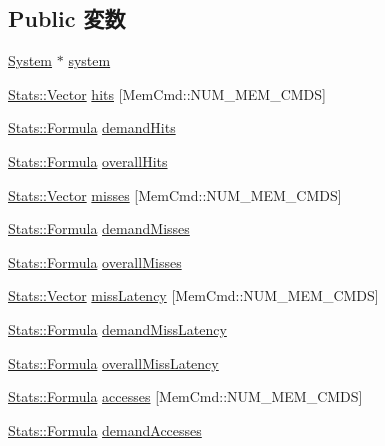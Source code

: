 \subsection*{Public 変数}
\begin{DoxyCompactItemize}
\item 
\hyperlink{classSystem}{System} $\ast$ \hyperlink{classBaseCache_af27ccd765f13a4b7bd119dc7579e2746}{system}
\item 
\hyperlink{classStats_1_1Vector}{Stats::Vector} \hyperlink{group__CacheStatistics_gad6a8ff96d397437943d0a35012008e84}{hits} \mbox{[}MemCmd::NUM\_\-MEM\_\-CMDS\mbox{]}
\item 
\hyperlink{classStats_1_1Formula}{Stats::Formula} \hyperlink{group__CacheStatistics_gafc2d55cfff6a5b55a9c19bf5c7b13729}{demandHits}
\item 
\hyperlink{classStats_1_1Formula}{Stats::Formula} \hyperlink{group__CacheStatistics_gaa4d78014f29a4bc534e1d71a1ada3bb8}{overallHits}
\item 
\hyperlink{classStats_1_1Vector}{Stats::Vector} \hyperlink{group__CacheStatistics_gaef820137ee3e0d7ce5895019f76e1ad7}{misses} \mbox{[}MemCmd::NUM\_\-MEM\_\-CMDS\mbox{]}
\item 
\hyperlink{classStats_1_1Formula}{Stats::Formula} \hyperlink{group__CacheStatistics_gab0c200c0250a66f1e1d8a257d3f9f313}{demandMisses}
\item 
\hyperlink{classStats_1_1Formula}{Stats::Formula} \hyperlink{group__CacheStatistics_ga15889ae23e7332b01de9bc31e05a21e5}{overallMisses}
\item 
\hyperlink{classStats_1_1Vector}{Stats::Vector} \hyperlink{group__CacheStatistics_gaf96751c776ee651f3284e22686b8978a}{missLatency} \mbox{[}MemCmd::NUM\_\-MEM\_\-CMDS\mbox{]}
\item 
\hyperlink{classStats_1_1Formula}{Stats::Formula} \hyperlink{group__CacheStatistics_gaef1ab5073e901bd4df644ff0780fc668}{demandMissLatency}
\item 
\hyperlink{classStats_1_1Formula}{Stats::Formula} \hyperlink{group__CacheStatistics_ga7d70913fe3dbd532369b977f9a28446c}{overallMissLatency}
\item 
\hyperlink{classStats_1_1Formula}{Stats::Formula} \hyperlink{group__CacheStatistics_gaa45ed75982de310df369d8bfa4b8896f}{accesses} \mbox{[}MemCmd::NUM\_\-MEM\_\-CMDS\mbox{]}
\item 
\hyperlink{classStats_1_1Formula}{Stats::Formula} \hyperlink{group__CacheStatistics_gae4b2f837d0d9919fe4ce7389922a001d}{demandAccesses}
\item 

\end{DoxyCompactItemize}
